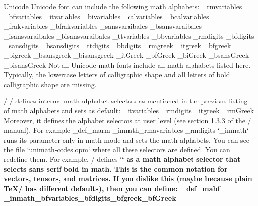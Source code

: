 \new Unicode
Unicode font can include the following math alphabets:
\begtt \typosize[9/11]
\_rmvariables      %
\_bfvariables      %
\_itvariables      %
\_bivariables      %
\_calvariables     %
\_bcalvariables    %
\_frakvariables    %
\_bfrakvariables   %
\_sansvaraibales   %
\_bsansvaraibales  %
\_isansvaraibales  %
\_bisansvaraibales %
\_ttvariables      %
\_bbvariables      %
\_rmdigits         %
\_bfdigits         %
\_sansdigits       %
\_bsansdigits      %
\_ttdigits         %
\_bbdigits         %
\_rmgreek          %
\_itgreek          %
\_bfgreek          %
\_bigreek          %
\_bsansgreek       %
\_bisansgreek      %
\_itGreek          %
\_bfGreek          %
\_biGreek          %
\_bsansGreek       %
\_bisansGreek      %
\endtt
%
Not all Unicode math fonts include all math alphabets listed here. Typically,
the lowercase letters of calligraphic shape and all letters of
bold calligraphic shape are missing.

\new \OpTeX/
\OpTeX/ defines internal math alphabet selectors as mentioned in the
previous listing of math alphabets and sets as default:
\begtt \typosize[10/12]
\_itvariables \_rmdigits \_itgreek \_rmGreek
\endtt
%
Moreover, it defines the alphabet selectors at user level (see section 1.3.3
of the \OpTeX/ manual). For example
\begtt \typosize[10/12]
\_def\_marm {\_inmath{\_rmavariables \_rmdigits}} %
\endtt
%
`\_inmath` runs its parameter only in math mode and sets the math alphabets.
You can see the file `unimath-codes.opm` where all these selectors are
defined. You can redefine them. For example, \OpTeX/ defines `\bf` as a math
alphabet selector that selects sans serif bold in math. This is the common
notation for vectors, tensors, and matrices. If you dislike this (maybe
because plain \TeX/ has different defaults), then you can define:
\begtt \typosize[10/12]
\_def\_mabf {\_inmath{\_bfvariables\_bfdigits\_bfgreek\_bfGreek}} %
\endtt


